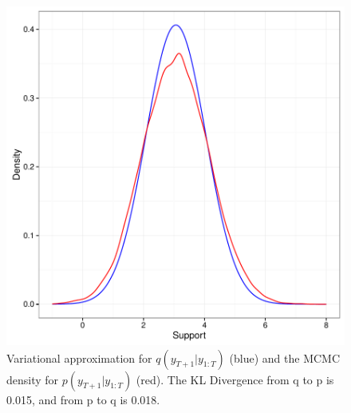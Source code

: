 \documentclass{article}
\begin{document}
\begin{figure}[hb]
\centering
\includegraphics{ar1_predictive-plots}
\caption{Variational approximation for $q(y_{T+1}|y_{1:T})$ (blue) and the MCMC density for $p(y_{T+1}|y_{1:T})$ (red). 
The KL Divergence from q to p is 0.015, and from p to q is 0.018.}
\label{densities}
\end{figure}
\end{document}
